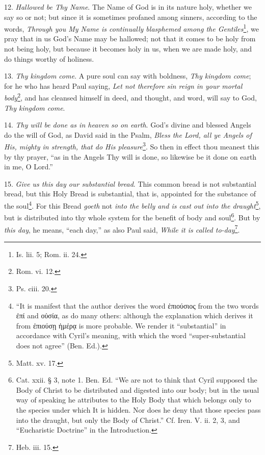 12. \emph{Hallowed be Thy Name}. The Name of God is in its nature holy, whether we say so or not; but since it is sometimes profaned among sinners, according to the words, \emph{Through you My Name is continually blasphemed among the Gentiles}\footnote{Is. lii. 5; Rom. ii. 24.}, we pray that in us God’s Name may be hallowed; not that it comes to be holy from not being holy, but because it becomes holy in us, when we are made holy, and do things worthy of holiness.

13. \emph{Thy kingdom come}. A pure soul can say with boldness, \emph{Thy kingdom come}; for he who has heard Paul saying, \emph{Let not therefore sin reign in your mortal body}\footnote{Rom. vi. 12.}, and has cleansed himself in deed, and thought, and word, will say to God, \emph{Thy kingdom come}.

14. \emph{Thy will be done as in heaven so on earth}. God’s divine and blessed Angels do the will of God, as David said in the Psalm, \emph{Bless the Lord, all ye Angels of His, mighty in strength, that do His pleasure}\footnote{Ps. ciii. 20.}. So then in effect thou meanest this by thy prayer, “as in the Angels Thy will is done, so likewise be it done on earth in me, O Lord.”

15. \emph{Give us this day our substantial bread}. This common bread is not substantial bread, but this Holy Bread is substantial, that is, appointed for the substance of the soul\footnote{“It is manifest that the author derives the word \textgreek{ἐπιούσιος} from the two words \textgreek{ἐπί} and \textgreek{οὐσία}, as do many others: although the explanation which derives it from \textgreek{ἐπιούσῃ ἡμέρᾳ} is more probable. We render it “substantial” in accordance with Cyril’s meaning, with which the word “super-substantial does not agree” (Ben. Ed.).}. For this Bread \emph{goeth} not \emph{into the belly and is cast out into the draught}\footnote{Matt. xv. 17.}, but is distributed into thy whole system for the benefit of body and soul\footnote{Cat. xxii. § 3, note 1. Ben. Ed. “We are not to think that Cyril supposed the Body of Christ to be distributed and digested into our body; but in the usual way of speaking he attributes to the Holy Body that which belongs only to the species under which It is hidden. Nor does he deny that those species pass into the draught, but only the Body of Christ.” Cf. Iren. V. ii. 2, 3, and “Eucharistic Doctrine” in the Introduction.}. But by \emph{this day}, he means, “each day,” as also Paul said, \emph{While it is called to-day}\footnote{Heb. iii. 15.}.

